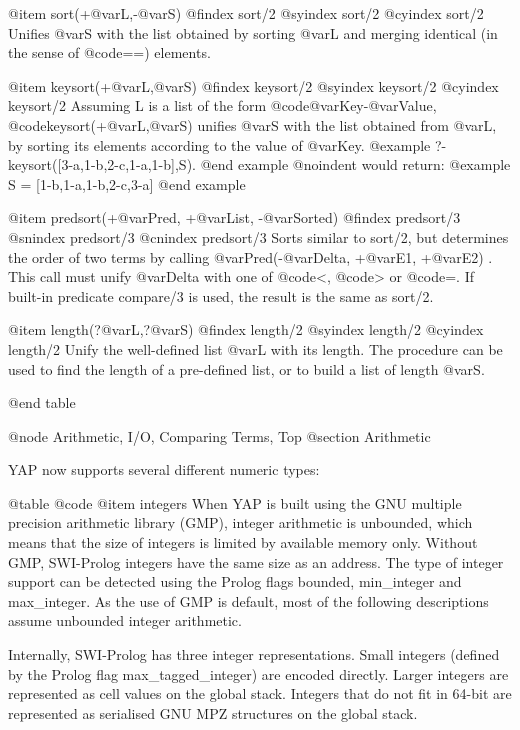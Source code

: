 {{{{@item sort(+@var{L},-@var{S})
@findex sort/2
@syindex sort/2
@cyindex sort/2
Unifies @var{S} with the list obtained by sorting @var{L} and  merging
identical (in the sense of @code{==}) elements.

@item keysort(+@var{L},@var{S})
@findex keysort/2
@syindex keysort/2
@cyindex keysort/2
Assuming L is a list of the form @code{@var{Key}-@var{Value}},
@code{keysort(+@var{L},@var{S})} unifies @var{S} with the list obtained
from @var{L}, by sorting its elements according to the value of
@var{Key}.
@example
?- keysort([3-a,1-b,2-c,1-a,1-b],S).
@end example
@noindent
would return:
@example
S = [1-b,1-a,1-b,2-c,3-a]
@end example

@item predsort(+@var{Pred}, +@var{List}, -@var{Sorted})
@findex predsort/3
@snindex predsort/3
@cnindex predsort/3
Sorts similar to sort/2, but determines the order of two terms by
calling @var{Pred}(-@var{Delta}, +@var{E1}, +@var{E2}) . This call must
unify @var{Delta} with one of @code{<}, @code{>} or @code{=}. If
built-in predicate compare/3 is used, the result is the same as
sort/2.

@item length(?@var{L},?@var{S})
@findex length/2
@syindex length/2
@cyindex length/2
Unify the well-defined list @var{L} with its length. The procedure can
be used to find the length of a pre-defined list, or to build a list
of length @var{S}.

@end table

@node Arithmetic, I/O, Comparing Terms, Top
@section Arithmetic

YAP now supports several different numeric types:

@table @code
@item integers
      When YAP is built using the GNU multiple precision arithmetic
      library (GMP), integer arithmetic is unbounded, which means that
      the size of integers is limited by available memory only. Without
      GMP, SWI-Prolog integers have the same size as an address. The
      type of integer support can be detected using the Prolog flags
      bounded, min_integer and max_integer. As the use of GMP is
      default, most of the following descriptions assume unbounded
      integer arithmetic.

      Internally, SWI-Prolog has three integer representations. Small
      integers (defined by the Prolog flag max_tagged_integer) are
      encoded directly. Larger integers are represented as cell values
      on the global stack. Integers that do not fit in 64-bit are
      represented as serialised GNU MPZ structures on the global stack.

}}}}
